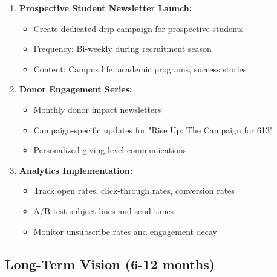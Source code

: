 \documentclass[12pt,letterpaper]{article}
\begin{document}
\begin{enumerate}[leftmargin=*]
    \item \textbf{Prospective Student Newsletter Launch:}
    \begin{itemize}
        \item Create dedicated drip campaign for prospective students
        \item Frequency: Bi-weekly during recruitment season
        \item Content: Campus life, academic programs, success stories
    \end{itemize}

    \item \textbf{Donor Engagement Series:}
    \begin{itemize}
        \item Monthly donor impact newsletters
        \item Campaign-specific updates for "Rise Up: The Campaign for 613"
        \item Personalized giving level communications
    \end{itemize}

    \item \textbf{Analytics Implementation:}
    \begin{itemize}
        \item Track open rates, click-through rates, conversion rates
        \item A/B test subject lines and send times
        \item Monitor unsubscribe rates and engagement decay
    \end{itemize}
\end{enumerate}

\subsection{Long-Term Vision (6-12 months)}
\end{document}
